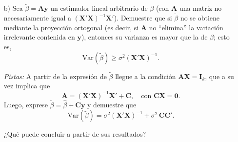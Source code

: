 \documentclass[a4paper, answers, addpoints, 11pt]{exam}
\newenvironment{solucion}{%
  \begin{mdframed}[
    backgroundcolor=blue!5,    %
    linecolor=blue!50,          %
    linewidth=2pt,              %
    leftmargin=10pt,            %
    rightmargin=8pt,           %
    topline=true,              %
    bottomline=true,            %
    roundcorner=10pt,           %
    innerleftmargin=10pt,       %
    innerrightmargin=10pt,      %
    innerbottommargin=10pt,     %
    innertopmargin=10pt         %
  ]%
  \begin{tcolorbox}[colframe=blue!50!black, colback=blue!50, coltitle=white, sharp corners=all, boxrule=1mm, width=\textwidth, halign=left, valign=center, top=0mm, bottom=0mm, left=0mm, right=0mm] \textbf{Solución} \end{tcolorbox} }{\end{mdframed}}
\begin{document}
\begin{enumerate}
\begin{itemize}
\begin{solucion}
\begin{proof}
\end{proof}
La clave en esta prueba es que $X^\top P=X^\top$. Esto es porque  \( P = X (X^\top X)^{-1} X^\top \), y la propiedad de la proyección ortogonal implica que proyectar \( X \) sobre el espacio generado por sus columnas no cambia las columnas de \( X \).  La estimación de \( \beta \) mediante la proyección ortogonal \( \hat{\beta} = (X'X)^{-1} X'y \) garantiza que toda la variación de \( y \) que no está contenida en el espacio columna de \( X \) se elimina. Los residuos \( \hat{\epsilon} = (I_n - P)y \) son ortogonales a todo vector en dicho espacio.

 \end{solucion}


    \item[b)] Sea \(\tilde{\beta} = \mathbf{A}\mathbf{y}\) un estimador lineal arbitrario de \(\beta\) (con \(\mathbf{A}\) una matriz no necesariamente igual a \((\mathbf{X}'\mathbf{X})^{-1}\mathbf{X}'\)). Demuestre que si \(\tilde{\beta}\) no se obtiene mediante la proyección ortogonal (es decir, si \(\mathbf{A}\) no ``elimina'' la variación irrelevante contenida en \(\mathbf{y}\)), entonces su varianza es mayor que la de \(\hat{\beta}\); esto es,
\[
\mathrm{Var}(\tilde{\beta}) \geq \sigma^2 (\mathbf{X}'\mathbf{X})^{-1}.
\]

\textit{Pistas:} A partir de la expresión de $\tilde{\beta}$ llegue a la condición \(\mathbf{A}\mathbf{X} = \mathbf{I}_k\), que a su vez implica que
\[
\mathbf{A} = (\mathbf{X}'\mathbf{X})^{-1}\mathbf{X}' + \mathbf{C}, \quad \text{con } \mathbf{C}\mathbf{X} = \mathbf{0}.
\]
Luego, exprese \(\tilde{\beta} = \hat{\beta} + \mathbf{C}\mathbf{y}\) y demuestre que
\[
\mathrm{Var}(\tilde{\beta}) = \sigma^2 (\mathbf{X}'\mathbf{X})^{-1} + \sigma^2\,\mathbf{C}\mathbf{C}'.
\] 

¿Qué puede concluir a partir de sus resultados?
\end{itemize}
\end{enumerate}
\end{document}
